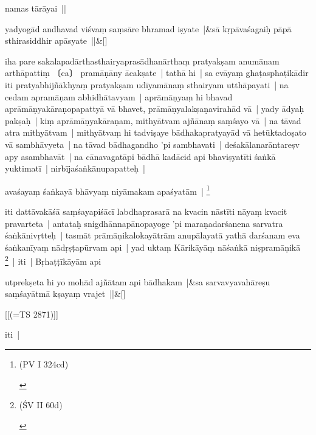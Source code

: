 \documentclass[article,a4paper]{memoir}
\begin{document}
	  \pstart namas tā\-rā\-yai ||
	\pend
      
	    
	    \stanza[\smallbreak]
yadyogā\-d andhavad viśvaṃ saṃsā\-re bhramad iṣyate |&sā\- kṛpā\-vaśagaiḥ pā\-pā\- sthirasiddhir apā\-syate ||\&[\smallbreak]


	

	  \pstart iha pare sakalapadā\-rthasthairyaprasā\-dhanā\-rthaṃ pratyakṣam anumā\-nam arthā\-pattiṃ 〔ca〕 pramā\-ṇā\-ny ā\-cakṣate | \label{thakur75-112.7} tathā\- hi | sa evā\-yaṃ ghaṭasphaṭikā\-dir iti pratyabhijñā\-khyaṃ pratyakṣam udī\-yamā\-naṃ sthairyam utthā\-payati | na cedam apramā\-ṇam abhidhā\-tavyam | aprā\-mā\-ṇyaṃ hi bhavad aprā\-mā\-ṇyakā\-raṇopapattyā\- vā\- bhavet, prā\-mā\-ṇyalakṣaṇavirahā\-d vā\- | \label{thakur75-112.9} yady ā\-dyaḥ pakṣaḥ | kiṃ aprā\-mā\-ṇyakā\-raṇam, mithyā\-tvam ajñā\-naṃ saṃśayo vā\- | \label{thakur75-112.10} na tā\-vad atra mithyā\-tvam | mithyā\-tvaṃ hi tadviṣaye bā\-dhakapratyayā\-d vā\- hetū\-ktadoṣato vā\- sambhā\-vyeta | \label{thakur75-112.11} na tā\-vad bā\-dhagandho 'pi sambhavati | deśakā\-lanarā\-ntareṣv apy asambhavā\-t | na cā\-navagatā\-pi bā\-dhā\- kadā\-cid api bhaviṣyatī\-ti śaṅkā\- yuktimatī\- | nirbī\-jaśaṅkā\-nupapatteḥ |
	\pend
      

	  \pstart avaśayaṃ śaṅkayā\- bhā\-vyaṃ niyā\-makam apaśyatā\-m | \footnote{\begin{english}(PV I 324cd)\end{english}}
	\pend
      

	  \pstart iti dattā\-vakā\-śā\- saṃśayapiśā\-cī\- labdhaprasarā\- na kvacin nā\-stī\-ti nā\-yaṃ kvacit pravarteta | antataḥ snigdhā\-nnapā\-nopayoge 'pi maraṇadarśanena sarvatra śaṅkā\-nivṛtteḥ | tasmā\-t prā\-mā\-ṇikalokayā\-trā\-m anupā\-layatā\- yathā\- darśanam eva śaṅkanī\-yaṃ nā\-dṛṣṭapū\-rvam api | \label{thakur75-112.18} yad uktaṃ Kā\-rikā\-yā\-ṃ nā\-śaṅkā\- niṣpramā\-ṇikā\- \footnote{\begin{english}(ŚV II 60d)\end{english}} | iti | Bṛhaṭṭī\-kā\-yā\-m api
	\pend
      
	    
	    \stanza[\smallbreak]
utprekṣeta hi yo mohā\-d ajñā\-tam api bā\-dhakam |&sa sarvavyavahā\-reṣu saṃśayā\-tmā\- kṣayaṃ vrajet ||\&[\smallbreak]


	[[(=TS 2871)]]

	  \pstart iti |
	\pend
      
\end{document}
